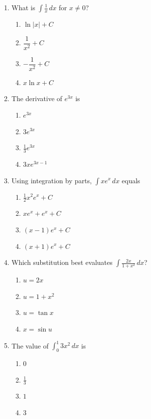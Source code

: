 \documentclass[11pt]{article}
\begin{document}
\vspace{1.2em}
\begin{enumerate}[label=\textbf{\arabic*.}, leftmargin=2em, itemsep=1.2em]

\item What is $\displaystyle\int \frac{1}{x}\,dx$ for $x \neq 0$?
  \begin{enumerate}[label=(\alph*), itemsep=1pt]
    \item $\ln|x| + C$
    \item $\dfrac{1}{x^2} + C$
    \item $-\dfrac{1}{x^2} + C$
    \item $x \ln x + C$
  \end{enumerate}

\item The derivative of $e^{3x}$ is
  \begin{enumerate}[label=(\alph*), itemsep=1pt]
    \item $e^{3x}$
    \item $3e^{3x}$
    \item $\frac{1}{3}e^{3x}$
    \item $3xe^{3x-1}$
  \end{enumerate}

\item Using integration by parts, $\displaystyle\int x e^{x}\,dx$ equals
  \begin{enumerate}[label=(\alph*), itemsep=1pt]
    \item $\frac{1}{2}x^2 e^{x} + C$
    \item $x e^{x} + e^{x} + C$
    \item $(x - 1)e^{x} + C$
    \item $(x + 1)e^{x} + C$
  \end{enumerate}

\item Which substitution best evaluates $\displaystyle\int \frac{2x}{1 + x^2}\,dx$?
  \begin{enumerate}[label=(\alph*), itemsep=1pt]
    \item $u = 2x$
    \item $u = 1 + x^2$
    \item $u = \tan x$
    \item $x = \sin u$
  \end{enumerate}

\item The value of $\displaystyle\int_0^{1} 3x^2\,dx$ is
  \begin{enumerate}[label=(\alph*), itemsep=1pt]
    \item $0$
    \item $\tfrac{1}{3}$
    \item $1$
    \item $3$
  \end{enumerate}

\end{enumerate}
\end{document}
